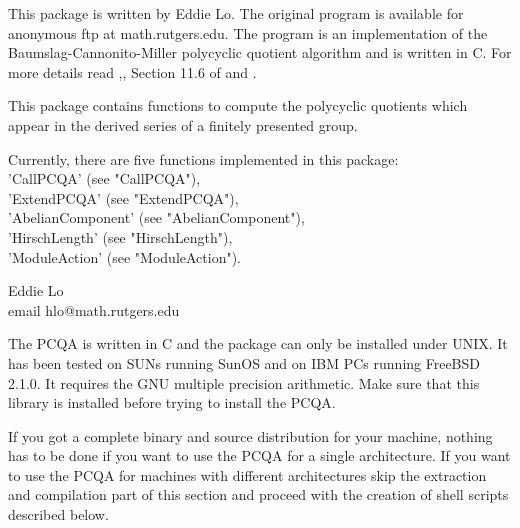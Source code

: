 \index{}

This package is written by  Eddie Lo.  The original program is  available
for anonymous ftp at  math.rutgers.edu. The program is an  implementation
of the  Baumslag-Cannonito-Miller  polycyclic quotient algorithm  and  is
written in C. For more details read \cite{BCMa},\cite{BCMb}, Section 11.6
of \cite{Sims94}and \cite{Lo}.

This package contains functions to compute the polycyclic quotients which
appear in the derived series of a finitely presented group.

Currently, there are five functions implemented in this package:\\
    'CallPCQA'            (see "CallPCQA"),\\
    'ExtendPCQA'          (see "ExtendPCQA"),\\
    'AbelianComponent'    (see "AbelianComponent"),\\
    'HirschLength'        (see "HirschLength"),\\
    'ModuleAction'        (see "ModuleAction").

Eddie Lo \\
email\: hlo@math.rutgers.edu 


The PCQA is  written in C  and the  package can  only  be installed under
UNIX.  It has  been tested on  SUNs running SunOS and  on IBM PCs running
FreeBSD 2.1.0.  It requires the  GNU multiple precision arithmetic.  Make
sure that this library is installed before trying to install the PCQA.

If you  got a complete binary  and source distribution  for your machine,
nothing   has to  be  done  if you  want  to use  the  PCQA  for a single
architecture.  If  you want to use  the PCQA  for machines with different
architectures skip the extraction  and compilation  part of this  section
and proceed with the creation of shell scripts described below.

